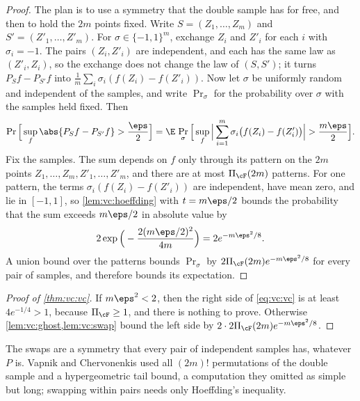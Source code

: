 \begin{refsection}

\begin{proof}
The plan is to use a symmetry that the double sample has for free, and then to hold the $2m$ points fixed. Write $S = (Z_1,\dots,Z_m)$ and $S' = (Z'_1,\dots,Z'_m)$. For $\sigma\in\{-1,1\}^m$, exchange $Z_i$ and $Z'_i$ for each $i$ with $\sigma_i = -1$. The pairs $(Z_i,Z'_i)$ are independent, and each has the same law as $(Z'_i,Z_i)$, so the exchange does not change the law of $(S,S')$; it turns $P_Sf-P_{S'}f$ into $\frac1m\sum_i\sigma_i(f(Z_i)-f(Z'_i))$. Now let $\sigma$ be uniformly random and independent of the samples, and write $\Pr_\sigma$ for the probability over $\sigma$ with the samples held fixed. Then
\[
  \Pr\Big[\sup_{f}\abs{P_Sf-P_{S'}f}>\frac\eps2\Big] = \E\,\Pr_\sigma\Big[\sup_{f}\Big|\sum_{i=1}^m\sigma_i\big(f(Z_i)-f(Z'_i)\big)\Big|>\frac{m\eps}2\Big].
\]
Fix the samples. The sum depends on $f$ only through its pattern on the $2m$ points $Z_1,\dots,Z_m,Z'_1,\dots,Z'_m$, and there are at most $\vcGrowth_{\cF}(2m)$ patterns. For one pattern, the terms $\sigma_i(f(Z_i)-f(Z'_i))$ are independent, have mean zero, and lie in $[-1,1]$, so \cref{lem:vc:hoeffding} with $t = m\eps/2$ bounds the probability that the sum exceeds $m\eps/2$ in absolute value by
\[
  2\exp\Big(-\frac{2(m\eps/2)^2}{4m}\Big) = 2e^{-m\eps^2/8} .
\]
A union bound over the patterns bounds $\Pr_\sigma$ by $2\vcGrowth_{\cF}(2m)e^{-m\eps^2/8}$ for every pair of samples, and therefore bounds its expectation.
\end{proof}

\begin{proof}[Proof of \cref{thm:vc:vc}]
If $m\eps^2<2$, then the right side of \eqref{eq:vc:vc} is at least $4e^{-1/4}>1$, because $\vcGrowth_{\cF}\ge1$, and there is nothing to prove. Otherwise \cref{lem:vc:ghost,lem:vc:swap} bound the left side by $2\cdot2\vcGrowth_{\cF}(2m)e^{-m\eps^2/8}$.
\end{proof}

The swaps are a symmetry that every pair of independent samples has, whatever $P$ is. Vapnik and Chervonenkis used all $(2m)!$ permutations of the double sample and a hypergeometric tail bound, a computation they omitted as simple but long; swapping within pairs needs only Hoeffding's inequality.


\end{refsection}
